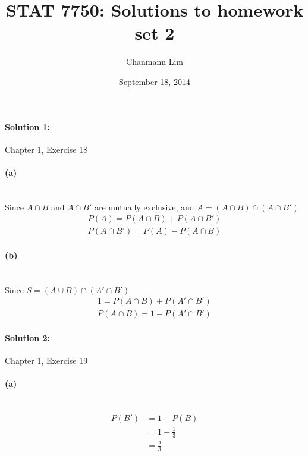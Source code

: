 \documentclass[a4paper]{article}
\begin{document}
\title{STAT 7750: Solutions to homework set 2}
\author{Chanmann Lim}
\date{September 18, 2014}
\maketitle

\paragraph{Solution 1:}
Chapter 1, Exercise 18 

\paragraph{(a)} ~\\

\indent Since $A \cap B$ and $A \cap B'$ are mutually exclusive, and $A = (A \cap B) \cap (A \cap B')$ \\
\begin{align*}
P(A) = P(A \cap B) + P(A \cap B') \\
P(A \cap B') = P(A) - P(A \cap B)
\end{align*}

\paragraph{(b)} ~\\

\indent Since $S = (A \cup B) \cap (A' \cap B')$ \\
\begin{align*} 
1 = P(A \cap B) + P(A' \cap B') \\
P(A \cap B) = 1 - P(A' \cap B')
\end{align*}

\paragraph{Solution 2:}
Chapter 1, Exercise 19

\paragraph{(a)} ~\\
\begin{align*} 
P(B') &= 1 - P(B) \\
      &= 1 - \frac{1}{3} \\
      &= \frac{2}{3}
\end{align*}
\end{document}
